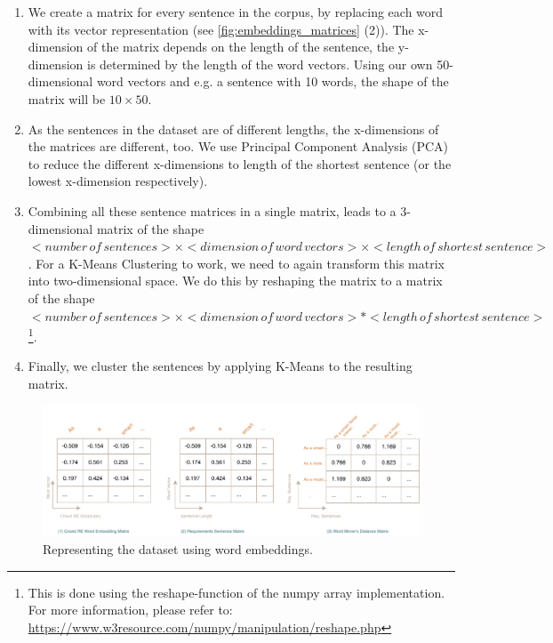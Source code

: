 \begin{enumerate}
\item We create a matrix for every sentence in the corpus, by replacing each word with its vector representation (see \autoref{fig:embeddings_matrices} (2)). The x-dimension of the matrix depends on the length of the sentence, the y-dimension is determined by the length of the word vectors. Using our own 50-dimensional word vectors and e.g. a sentence with 10 words, the shape of the matrix will be $10\times50$.
\item As the sentences in the dataset are of different lengths, the x-dimensions of the matrices are different, too. We use Principal Component Analysis (PCA)\,\cite{wold_principal_1987} to reduce the different x-dimensions to length of the shortest sentence (or the lowest x-dimension respectively).
\item Combining all these sentence matrices in a single matrix, leads to a 3-dimensional matrix of the shape $<number\,of\,sentences>\times<dimension\,of\,word\,vectors>\times<length\,of\,shortest\,sentence>$. For a K-Means Clustering to work, we need to again transform this matrix into two-dimensional space. We do this by reshaping the matrix to a matrix of the shape $<number\,of\,sentences>\times<dimension\,of\,word\,vectors>*<length\,of\,shortest\,sentence>$\footnote{This is done using the reshape-function of the numpy array implementation. For more information, please refer to: \url{https://www.w3resource.com/numpy/manipulation/reshape.php}}.
\item Finally, we cluster the sentences by applying K-Means to the resulting matrix.
\end{enumerate}

\begin{figure}[ht]
  \begin{center}
    \includegraphics[width=\textwidth]{figures/embedding_matrices.pdf}
    \caption{Representing the \crowdre{} dataset using word embeddings.}
    \label{fig:embeddings_matrices}
  \end{center}
\end{figure}




